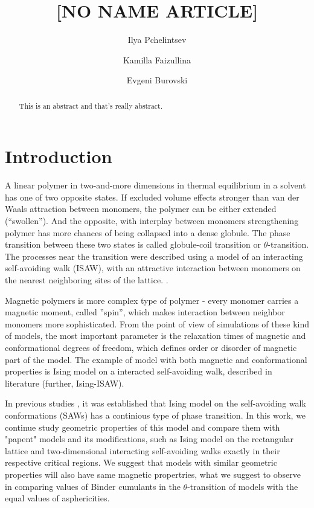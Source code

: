 \documentclass[aps,pre,amssymb,amsmath,twocolumn,floatfix]{revtex4-2}
\begin{document}
\title{[NO NAME ARTICLE]}

\author{Ilya Pchelintsev}
\author{Kamilla Faizullina}
\author{Evgeni Burovski}



\begin{abstract}
    This is an abstract and that's really abstract.
\end{abstract}

\maketitle

\section{Introduction}

A linear polymer in two-and-more dimensions in thermal equilibrium in a solvent has one of two opposite states. If excluded volume effects stronger than van der Waals attraction between monomers, the polymer can be either extended (``swollen''). And the opposite, with interplay between monomers strengthening polymer has more chances of being collapsed into a dense globule. The phase transition between these two states is called globule-coil transition or $\theta$-transition. The processes near the transition were described using a model of an interacting self-avoiding walk (ISAW), with an attractive interaction between monomers on the nearest neighboring sites of the lattice. \cite{Vanderzande1998, Caracciolo_2011}.

Magnetic polymers is more complex type of polymer - every monomer carries a magnetic moment, called ''spin'', which makes interaction between neighbor monomers more sophisticated. From the point of view of simulations of these kind of models, the most important parameter is the relaxation times of magnetic and conformational degrees of freedom, which defines order or disorder of magnetic part of the model. The example of model with both magnetic and conformational properties is Ising model on a interacted self-avoiding walk, described in literature \cite{faizullina2021critical, Foster2021} (further, Ising-ISAW).

In previous studies \cite{faizullina2021critical}, it was established that Ising model on the self-avoiding walk conformations (SAWs) has a continious type of phase transition. In this work, we continue study geometric properties of this model and compare them with "papent" models and its modifications, such as Ising model on the rectangular lattice\cite{Selke2006} and two-dimensional interacting self-avoiding walks exactly in their respective critical regions. We suggest that models with similar geometric properties will also have same magnetic propertries, what we suggest to observe in comparing values of Binder cumulants in the $\theta$-transition of models with the equal values of asphericities.
\end{document}
